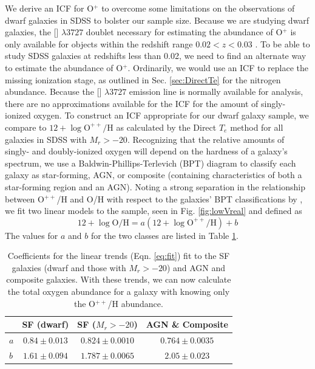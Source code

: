 We derive an ICF for O$^+$ to overcome some limitations on the observations of 
dwarf galaxies in SDSS to bolster our sample size.  Because we are studying 
dwarf galaxies, the [] $\lambda 3727$ doublet necessary for estimating 
the abundance of O$^+$ is only available for objects within the redshift range 
$0.02 < z < 0.03$ \citep[see Sec. \ref{sec:SDSS_limits_P3} and][for more 
details]{Douglass17a}.  To be able to study SDSS galaxies at redshifts less than 
0.02, we need to find an alternate way to estimate the abundance of O$^+$.  
Ordinarily, we would use an ICF to replace the missing ionization stage, as 
outlined in Sec. \ref{sec:DirectTe} for the nitrogen abundance.  Because the 
[] $\lambda 3727$ emission line is normally available for analysis, 
there are no approximations available for the ICF for the amount of 
singly-ionized oxygen.  To construct an ICF appropriate for our dwarf galaxy 
sample, we compare \OH to $12 + \log{\text{O}^{++}/\text{H}}$ as calculated by 
the Direct $T_e$ method for all galaxies in SDSS with $M_r > -20$.  Recognizing 
that the relative amounts of singly- and doubly-ionized oxygen will depend on 
the hardness of a galaxy's spectrum, we use a Baldwin-Phillips-Terlevich (BPT) 
diagram \citep{Baldwin81} to classify each galaxy as star-forming, AGN, or 
composite (containing characteristics of both a star-forming region and an AGN).  
Noting a strong separation in the relationship between O$^{++}$/H and O/H with 
respect to the galaxies' BPT classifications by \cite{Brinchmann04}, we fit two 
linear models to the sample, seen in Fig. \ref{fig:lowVreal} and defined as 
\begin{equation}\label{eq:fit}
    12 + \log{\text{O}/\text{H}} = a(12 + \log{\text{O}^{++}/\text{H}}) + b
\end{equation}
The values for $a$ and $b$ for the two classes are listed in Table \ref{tab:ab}.



\begin{table}
\centering

    \begin{tabular}{l|c|c|c}
         & SF (dwarf) & SF ($M_r > -20$) & AGN \& Composite\\
        \hline
        $a$ & $0.84 \pm 0.013$ & $0.824 \pm 0.0010$ & $0.764 \pm 0.0035$\\
        $b$ & $1.61 \pm 0.094$ & $1.787 \pm 0.0065$ & $2.05 \pm 0.023$
    \end{tabular}
    
    \caption[Coefficients of O$^+$ approximation]{Coefficients for the linear 
    trends (Eqn. \ref{eq:fit}) fit to the SF galaxies (dwarf and those with 
    $M_r > -20$) and AGN and composite galaxies.  With these trends, we can now 
    calculate the total oxygen abundance for a galaxy with knowing only the 
    O$^{++}$/H abundance.}
    
    \label{tab:ab}
    
\end{table}



